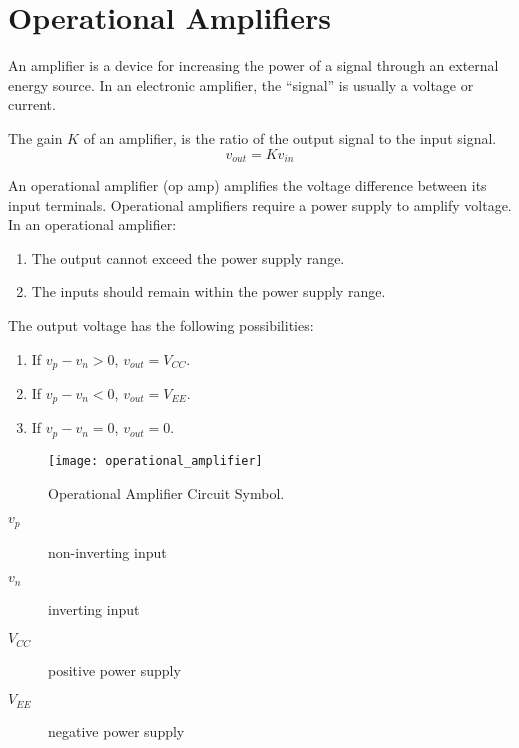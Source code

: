 \documentclass{article}
\begin{document}
\section{Operational Amplifiers}
\begin{definition}[Amplifier]
    An amplifier is a device for increasing the power of a signal through an external energy source.
    In an electronic amplifier, the ``signal'' is usually a voltage or current.
\end{definition}
\begin{definition}[Gain]
    The gain $K$ of an amplifier, is the ratio of the output signal to the input signal.
    \begin{equation*}
        v_{out} = K v_{in}
    \end{equation*}
\end{definition}
\begin{definition}
    An operational amplifier (op amp) amplifies the voltage difference between its input terminals.
    Operational amplifiers require a power supply to amplify voltage.
    In an operational amplifier:
    \begin{enumerate}
        \item The output cannot exceed the power supply range.
        \item The inputs should remain within the power supply range.
    \end{enumerate}
    The output voltage has the following possibilities:
    \begin{enumerate}
        \item If $v_p - v_n > 0$, $v_{out} = V_{CC}$.
        \item If $v_p - v_n < 0$, $v_{out} = V_{EE}$.
        \item If $v_p - v_n = 0$, $v_{out} = 0$.
    \end{enumerate}
    \begin{figure}[H]
        \centering
        \texttt{[image: operational\_amplifier]}
        \caption{Operational Amplifier Circuit Symbol.}
    \end{figure}
    \begin{description}
        \item[$v_p$] non-inverting input
        \item[$v_n$] inverting input
        \item[$V_{CC}$] positive power supply
        \item[$V_{EE}$] negative power supply
    \end{description}
\end{definition}
\end{document}
